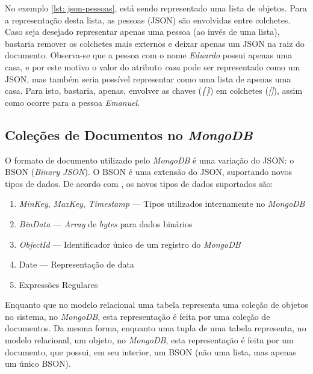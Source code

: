 No exemplo \ref{lst: json-pessoas}, está sendo representado uma lista de objetos. Para a representação desta lista, as pessoas (JSON) são envolvidas entre colchetes. Caso seja desejado representar apenas uma pessoa (ao invés de uma lista), bastaria remover os colchetes mais externos e deixar apenas um JSON na raiz do documento. Observa-se que a pessoa com o nome \textit{Eduardo} possui apenas uma casa, e por este motivo o valor do atributo \textit{casa} pode ser representado como um JSON, mas também seria possível representar como uma lista de apenas uma casa. Para isto, bastaria, apenas, envolver as chaves (\textit{\{\}}) em colchetes (\textit{[]}), assim como ocorre para a pessoa \textit{Emanuel}.

\subsection{Coleções de Documentos no \textit{MongoDB}}
    
O formato de documento utilizado pelo \textit{MongoDB} é uma variação do JSON: o BSON (\textit{Binary JSON}). O BSON é uma extensão do JSON, suportando novos tipos de dados. De acordo com , os novos tipos de dados suportados são:

\begin{enumerate}
    \item \textit{MinKey}, \textit{MaxKey}, \textit{Timestamp} --- Tipos utilizados internamente no \textit{MongoDB}

    \item \textit{BinData} --- \textit{Array} de \textit{bytes} para dados binários

    \item \textit{ObjectId} --- Identificador único de um registro do \textit{MongoDB}

    \item Date --- Representação de data
    
    \item Expressões Regulares
\end{enumerate}

Enquanto que no modelo relacional uma tabela representa uma coleção de objetos no sistema, no \textit{MongoDB}, esta representação é feita por uma coleção de documentos. Da mesma forma, enquanto uma tupla de uma tabela representa, no modelo relacional, um objeto, no \textit{MongoDB}, esta representação é feita por um documento, que possui, em seu interior, um BSON (não uma lista, mas apenas um único BSON).
    
